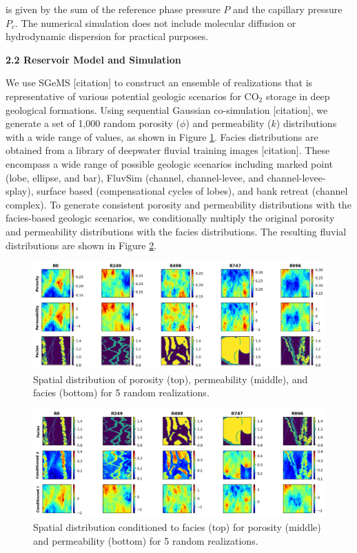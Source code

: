 \documentclass[10pt, twoside]{article}
\begin{document}
is given by the sum of the reference phase pressure $P$ and the capillary pressure $P_c$. The numerical simulation does not include molecular diffusion or hydrodynamic dispersion for practical purposes.

\textbf{2.2 Reservoir Model and Simulation} 

We use SGeMS [citation] to construct an ensemble of realizations that is representative of various potential geologic scenarios for CO$_2$ storage in deep geological formations. Using sequential Gaussian co-simulation [citation], we generate a set of 1,000 random porosity ($\phi$) and permeability ($k$) distributions with a wide range of values, as shown in Figure \ref{geomodels}. Facies distributions are obtained from a library of deepwater fluvial training images [citation]. These encompass a wide range of possible geologic scenarios including marked point (lobe, ellipse, and bar), FluvSim (channel, channel-levee, and channel-levee-splay), surface based (compensational cycles of lobes), and bank retreat (channel complex). To generate consistent porosity and permeability distributions with the facies-based geologic scenarios, we conditionally multiply the original porosity and permeability distributions with the facies distributions. The resulting fluvial distributions are shown in Figure \ref{conditioned_geomodels}. 

\begin{figure}[t]
    \centering
    \includegraphics[width=16cm]{figures/geomodels.png}
    \caption{Spatial distribution of porosity (top), permeability (middle), and facies (bottom) for 5 random realizations.}
    \label{geomodels}
\end{figure}

\begin{figure}[t]
    \centering
    \includegraphics[width=16cm]{figures/conditioned_geomodels.png}
    \caption{Spatial distribution conditioned to facies (top) for porosity (middle) and permeability (bottom) for 5 random realizations.}
    \label{conditioned_geomodels}
\end{figure}
\end{document}
